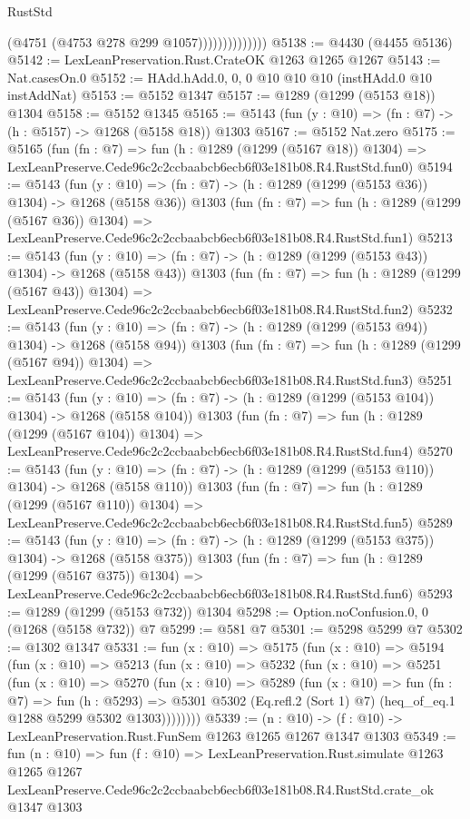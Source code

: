 \begin{lexlean}{RustStd}
\begin{coremodule}
                            (@4751 (@4753 @278 @299 @1057))))))))))))))
@5138 := @4430 (@4455 @5136)
@5142 := LexLeanPreservation.Rust.CrateOK @1263 @1265 @1267
@5143 := Nat.casesOn.{0}
@5152 := HAdd.hAdd.{0, 0, 0} @10 @10 @10 (instHAdd.{0} @10 instAddNat)
@5153 := @5152 @1347
@5157 := @1289 (@1299 (@5153 @18)) @1304
@5158 := @5152 @1345
@5165 := @5143 (fun (y : @10) => (fn : @7) -> (h : @5157) -> @1268 (@5158 @18)) @1303
@5167 := @5152 Nat.zero
@5175 := @5165
    (fun (fn : @7) =>
    fun (h : @1289 (@1299 (@5167 @18)) @1304) =>
    LexLeanPreserve.Cede96c2c2ccbaabcb6ecb6f03e181b08.R4.RustStd.fun0)
@5194 := @5143
    (fun (y : @10) => (fn : @7) -> (h : @1289 (@1299 (@5153 @36)) @1304) -> @1268 (@5158 @36))
    @1303
    (fun (fn : @7) =>
    fun (h : @1289 (@1299 (@5167 @36)) @1304) =>
    LexLeanPreserve.Cede96c2c2ccbaabcb6ecb6f03e181b08.R4.RustStd.fun1)
@5213 := @5143
    (fun (y : @10) => (fn : @7) -> (h : @1289 (@1299 (@5153 @43)) @1304) -> @1268 (@5158 @43))
    @1303
    (fun (fn : @7) =>
    fun (h : @1289 (@1299 (@5167 @43)) @1304) =>
    LexLeanPreserve.Cede96c2c2ccbaabcb6ecb6f03e181b08.R4.RustStd.fun2)
@5232 := @5143
    (fun (y : @10) => (fn : @7) -> (h : @1289 (@1299 (@5153 @94)) @1304) -> @1268 (@5158 @94))
    @1303
    (fun (fn : @7) =>
    fun (h : @1289 (@1299 (@5167 @94)) @1304) =>
    LexLeanPreserve.Cede96c2c2ccbaabcb6ecb6f03e181b08.R4.RustStd.fun3)
@5251 := @5143
    (fun (y : @10) => (fn : @7) -> (h : @1289 (@1299 (@5153 @104)) @1304) -> @1268 (@5158 @104))
    @1303
    (fun (fn : @7) =>
    fun (h : @1289 (@1299 (@5167 @104)) @1304) =>
    LexLeanPreserve.Cede96c2c2ccbaabcb6ecb6f03e181b08.R4.RustStd.fun4)
@5270 := @5143
    (fun (y : @10) => (fn : @7) -> (h : @1289 (@1299 (@5153 @110)) @1304) -> @1268 (@5158 @110))
    @1303
    (fun (fn : @7) =>
    fun (h : @1289 (@1299 (@5167 @110)) @1304) =>
    LexLeanPreserve.Cede96c2c2ccbaabcb6ecb6f03e181b08.R4.RustStd.fun5)
@5289 := @5143
    (fun (y : @10) => (fn : @7) -> (h : @1289 (@1299 (@5153 @375)) @1304) -> @1268 (@5158 @375))
    @1303
    (fun (fn : @7) =>
    fun (h : @1289 (@1299 (@5167 @375)) @1304) =>
    LexLeanPreserve.Cede96c2c2ccbaabcb6ecb6f03e181b08.R4.RustStd.fun6)
@5293 := @1289 (@1299 (@5153 @732)) @1304
@5298 := Option.noConfusion.{0, 0} (@1268 (@5158 @732)) @7
@5299 := @581 @7
@5301 := @5298 @5299 @7
@5302 := @1302 @1347
@5331 := fun (x : @10) =>
  @5175
    (fun (x : @10) =>
    @5194
      (fun (x : @10) =>
      @5213
        (fun (x : @10) =>
        @5232
          (fun (x : @10) =>
          @5251
            (fun (x : @10) =>
            @5270
              (fun (x : @10) =>
              @5289
                (fun (x : @10) =>
                fun (fn : @7) =>
                fun (h : @5293) =>
                @5301 @5302 (Eq.refl.{2} (Sort 1) @7) (heq_of_eq.{1} @1288 @5299 @5302 @1303))))))))
@5339 := (n : @10) -> (f : @10) -> LexLeanPreservation.Rust.FunSem @1263 @1265 @1267 @1347 @1303
@5349 := fun (n : @10) =>
  fun (f : @10) =>
  LexLeanPreservation.Rust.simulate
    @1263
    @1265
    @1267
    LexLeanPreserve.Cede96c2c2ccbaabcb6ecb6f03e181b08.R4.RustStd.crate_ok
    @1347
    @1303
\end{coremodule}
\end{lexlean}
